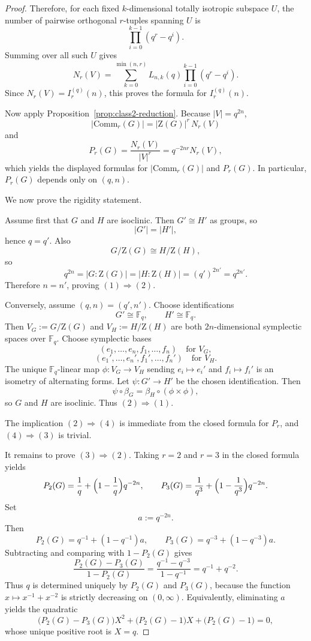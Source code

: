 \documentclass[11pt]{article}
\theoremstyle{definition}
\theoremstyle{remark}
\theoremstyle{definition}
\theoremstyle{plain}
\newcommand{\Z}{\mathrm{Z}}
\newcommand{\Comm}{\mathrm{Comm}}
\begin{document}
\begin{proof}
Therefore, for each fixed $k$-dimensional totally isotropic subspace $U$, the number of pairwise orthogonal
$r$-tuples spanning $U$ is
\[
\prod_{i=0}^{k-1}(q^r-q^i).
\]
Summing over all such $U$ gives
\[
N_r(V)
=
\sum_{k=0}^{\min(n,r)}
L_{n,k}(q)\prod_{i=0}^{k-1}(q^r-q^i).
\]
Since $N_r(V)=I_r^{(q)}(n)$, this proves the formula for $I_r^{(q)}(n)$.

Now apply Proposition~\ref{prop:class2-reduction}. Because $|V|=q^{2n}$,
\[
|\Comm_r(G)|=|\Z(G)|^r\,N_r(V)
\]
and
\[
P_r(G)=\frac{N_r(V)}{|V|^r}=q^{-2nr}N_r(V),
\]
which yields the displayed formulas for $|\Comm_r(G)|$ and $P_r(G)$.
In particular, $P_r(G)$ depends only on $(q,n)$.

We now prove the rigidity statement.

Assume first that $G$ and $H$ are isoclinic.
Then $G'\cong H'$ as groups, so
\[
|G'|=|H'|,
\]
hence $q=q'$.
Also
\[
G/\Z(G)\cong H/\Z(H),
\]
so
\[
q^{2n}=|G:\Z(G)|=|H:\Z(H)|=(q')^{2n'}=q^{2n'}.
\]
Therefore $n=n'$, proving $(1)\Rightarrow(2)$.

Conversely, assume $(q,n)=(q',n')$.
Choose identifications
\[
G'\cong \mathbb F_q,\qquad H'\cong \mathbb F_q.
\]
Then $V_G:=G/\Z(G)$ and $V_H:=H/\Z(H)$ are both $2n$-dimensional symplectic spaces over $\mathbb F_q$.
Choose symplectic bases
\[
(e_1,\dots,e_n,f_1,\dots,f_n)\quad\text{for }V_G,
\]
\[
(e_1',\dots,e_n',f_1',\dots,f_n')\quad\text{for }V_H.
\]
The unique $\mathbb F_q$-linear map $\phi:V_G\to V_H$ sending $e_i\mapsto e_i'$ and $f_i\mapsto f_i'$
is an isometry of alternating forms.
Let $\psi:G'\to H'$ be the chosen identification.
Then
\[
\psi\circ \beta_G=\beta_H\circ(\phi\times\phi),
\]
so $G$ and $H$ are isoclinic. Thus $(2)\Rightarrow(1)$.

The implication $(2)\Rightarrow(4)$ is immediate from the closed formula for $P_r$,
and $(4)\Rightarrow(3)$ is trivial.

It remains to prove $(3)\Rightarrow(2)$.
Taking $r=2$ and $r=3$ in the closed formula yields
\[
P_2(G)=\frac1q+\Bigl(1-\frac1q\Bigr)q^{-2n},
\qquad
P_3(G)=\frac1{q^3}+\Bigl(1-\frac1{q^3}\Bigr)q^{-2n}.
\]
Set
\[
a:=q^{-2n}.
\]
Then
\[
P_2(G)=q^{-1}+(1-q^{-1})a,\qquad
P_3(G)=q^{-3}+(1-q^{-3})a.
\]
Subtracting and comparing with $1-P_2(G)$ gives
\[
\frac{P_2(G)-P_3(G)}{1-P_2(G)}
=
\frac{q^{-1}-q^{-3}}{1-q^{-1}}
=
q^{-1}+q^{-2}.
\]
Thus $q$ is determined uniquely by $P_2(G)$ and $P_3(G)$, because the function
$x\mapsto x^{-1}+x^{-2}$ is strictly decreasing on $(0,\infty)$.
Equivalently, eliminating $a$ yields the quadratic
\[
\bigl(P_2(G)-P_3(G)\bigr)X^2+\bigl(P_2(G)-1\bigr)X+\bigl(P_2(G)-1\bigr)=0,
\]
whose unique positive root is $X=q$.


\end{proof}
\end{document}

